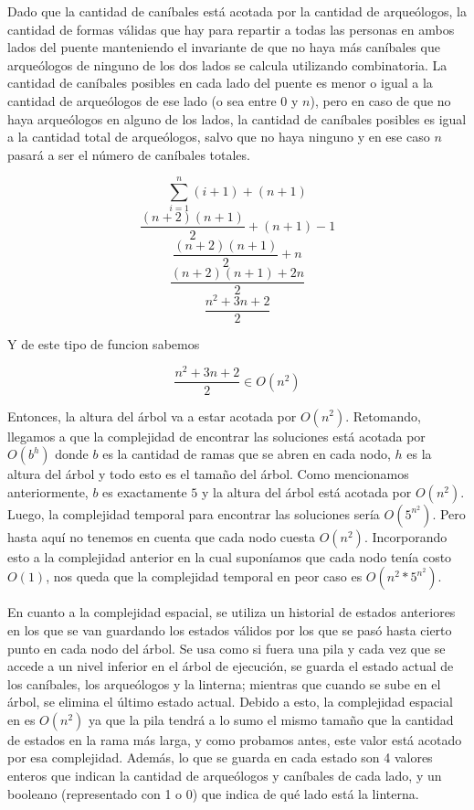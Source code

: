       Dado que la cantidad de caníbales está acotada por la cantidad de arqueólogos, la cantidad de formas válidas que hay para repartir a todas las personas en ambos lados del puente manteniendo el invariante de que no haya más caníbales que arqueólogos de ninguno de los dos lados se calcula utilizando combinatoria. La cantidad de caníbales posibles en cada lado del puente es menor o igual a la cantidad de arqueólogos de ese lado (o sea entre $0$ y $n$), pero en caso de que no haya arqueólogos en alguno de los lados, la cantidad de caníbales posibles es igual a la cantidad total de arqueólogos, salvo que no haya ninguno y en ese caso $n$ pasará a ser el número de caníbales totales.

      \[
      \sum_{i=1}^{n}(i+1) + (n+1)
      \]
      \[
      \frac{(n+2)(n+1)}{2} + (n+1) - 1
      \]
      \[
      \frac{(n+2)(n+1)}{2} + n
      \]
      \[
      \frac{(n+2)(n+1)+2n}{2}
      \]
      \[
      \frac{n^2+3n+2}{2}
      \]

      Y de este tipo de funcion sabemos \newline

      \[
      \frac{n^2+3n+2}{2} \in O(n^2)
      \]

      Entonces, la altura del árbol va a estar acotada por $O(n^2)$.
      Retomando, llegamos a que la complejidad de encontrar las soluciones está acotada por $O(b^h)$ donde $b$ es la cantidad de ramas que se abren en cada nodo, $h$ es la altura del árbol y todo esto es el tamaño del árbol. Como mencionamos anteriormente, $b$ es exactamente $5$ y la altura del árbol está acotada por $O(n^2)$. Luego, la complejidad temporal para encontrar las soluciones sería $O(5^{n^2})$. Pero hasta aquí no tenemos en cuenta que cada nodo cuesta $O(n^2)$. Incorporando esto a la complejidad anterior en la cual suponíamos que cada nodo tenía costo $O(1)$, nos queda que la complejidad temporal en peor caso es $O(n^2 * 5^{n^2})$.

      En cuanto a la complejidad espacial, se utiliza un historial de estados anteriores en los que se van guardando los estados válidos por los que se pasó hasta cierto punto en cada nodo del árbol. Se usa como si fuera una pila y cada vez que se accede a un nivel inferior en el árbol de ejecución, se guarda el estado actual de los caníbales, los arqueólogos y la linterna; mientras que cuando se sube en el árbol, se elimina el último estado actual. Debido a esto, la complejidad espacial en es $O(n^2)$ ya que la pila tendrá a lo sumo el mismo tamaño que la cantidad de estados en la rama más larga, y como probamos antes, este valor está acotado por esa complejidad. Además, lo que se guarda en cada estado son 4 valores enteros que indican la cantidad de arqueólogos y caníbales de cada lado, y un booleano (representado con 1 o 0) que indica de qué lado está la linterna.


